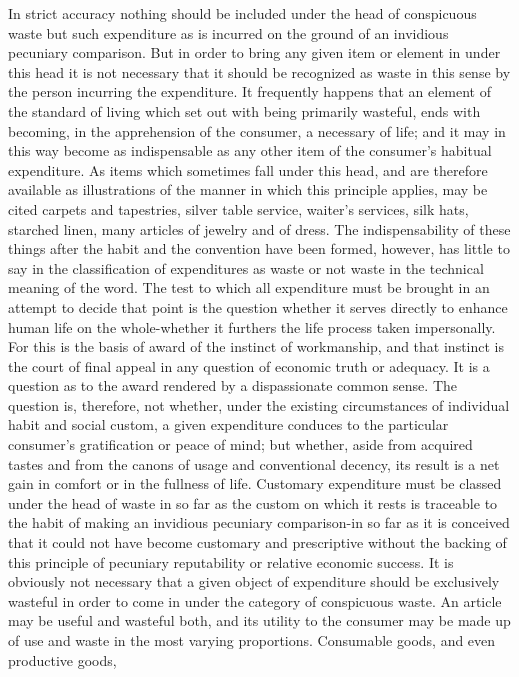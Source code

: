 \documentclass[12pt]{report}
\begin{document}
In strict accuracy nothing should be included under the head of
conspicuous waste but such expenditure as is incurred on the ground of
an invidious pecuniary comparison. But in order to bring any given item
or element in under this head it is not necessary that it should
be recognized as waste in this sense by the person incurring the
expenditure. It frequently happens that an element of the standard of
living which set out with being primarily wasteful, ends with becoming,
in the apprehension of the consumer, a necessary of life; and it may
in this way become as indispensable as any other item of the consumer's
habitual expenditure. As items which sometimes fall under this head,
and are therefore available as illustrations of the manner in which this
principle applies, may be cited carpets and tapestries, silver table
service, waiter's services, silk hats, starched linen, many articles
of jewelry and of dress. The indispensability of these things after the
habit and the convention have been formed, however, has little to say
in the classification of expenditures as waste or not waste in the
technical meaning of the word. The test to which all expenditure must
be brought in an attempt to decide that point is the question whether it
serves directly to enhance human life on the whole-whether it furthers
the life process taken impersonally. For this is the basis of award of
the instinct of workmanship, and that instinct is the court of final
appeal in any question of economic truth or adequacy. It is a question
as to the award rendered by a dispassionate common sense. The question
is, therefore, not whether, under the existing circumstances of
individual habit and social custom, a given expenditure conduces to the
particular consumer's gratification or peace of mind; but whether,
aside from acquired tastes and from the canons of usage and conventional
decency, its result is a net gain in comfort or in the fullness of life.
Customary expenditure must be classed under the head of waste in so far
as the custom on which it rests is traceable to the habit of making
an invidious pecuniary comparison-in so far as it is conceived that it
could not have become customary and prescriptive without the backing of
this principle of pecuniary reputability or relative economic success.
It is obviously not necessary that a given object of expenditure should
be exclusively wasteful in order to come in under the category of
conspicuous waste. An article may be useful and wasteful both, and its
utility to the consumer may be made up of use and waste in the most
varying proportions. Consumable goods, and even productive goods,
\end{document}
